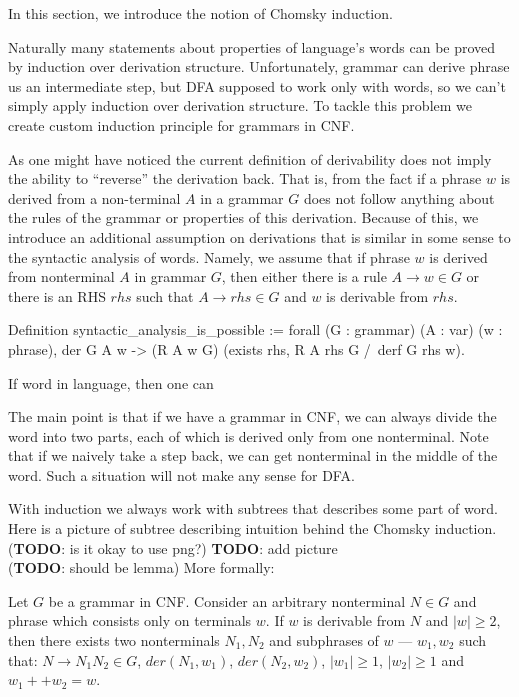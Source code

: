 In this section, we introduce the notion of Chomsky induction.

Naturally many statements about properties of language's words can be proved by induction over derivation structure. Unfortunately, grammar can derive phrase us an intermediate step, but DFA supposed to work only with words, so we can’t simply apply induction over derivation structure. To tackle this problem we create custom induction principle for grammars in CNF.

As one might have noticed the current definition of derivability does not imply the ability to ``reverse'' the derivation back. That is, from the fact if a phrase $w$ is derived from a non-terminal $A$ in a grammar $G$ does not follow anything about the rules of the grammar or properties of this derivation. Because of this, we introduce an additional assumption on derivations that is similar in some sense to the syntactic analysis of words.
Namely, we assume that if phrase $w$ is derived from nonterminal $A$ in grammar $G$, then either there is a rule $A \to w \in G$ or there is an RHS $rhs$ such that $A \to rhs \in G$ and $w$ is derivable from $rhs$.

\begin{listing}[h]
    \begin{pyglist}[language=coq, numbers=none, numbersep=5pt]
Definition syntactic_analysis_is_possible :=
  forall (G : grammar) (A : var) (w : phrase),
  der G A w ->
   (R A w \in G) \/ 
   (exists rhs, R A rhs \in G /\ derf G rhs w).
  
  \end{pyglist}
    \caption{If word in language, then one can }
    \label{lst:synt-analysis-is-possible}
\end{listing}

The main point is that if we have a grammar in CNF, we can always divide the word into two parts, each of which is derived only from one nonterminal. Note that if we naively take a step back, we can get nonterminal in the middle of the word. Such a situation will not make any sense for DFA.

With induction we always work with subtrees that describes some part of word. Here is a picture of subtree describing intuition behind the Chomsky induction. \\

(\textbf{TODO}: is it okay to use png?)
\textbf{TODO}: add picture\\ 

(\textbf{TODO}: should be lemma) More formally: 
\begin{theorem}
Let $G$ be a grammar in CNF. Consider an arbitrary nonterminal $N \in G$ and phrase which consists only on terminals $w$. 
If $w$ is derivable from $N$ and $|w| \ge 2$, then there exists two nonterminals $N_1, N_2$ and subphrases of $w$ --- $w_1, w_2$ such that: $N \to N_1 N_2 \in G$, $der(N_1, w_1)$, $der(N_2, w_2)$, $|w_1| \ge 1$, $|w_2| \ge 1$ and $w_1 ++ w_2 = w$.
\end{theorem}

